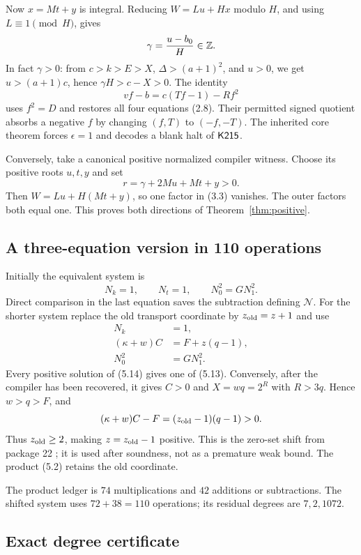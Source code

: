 Now \(x=Mt+y\) is integral. Reducing \(W=Lu+Hx\) modulo \(H\),
and using \(L\equiv1\pmod H\), gives
\[
\gamma=\frac{u-b_0}{H}\in\mathbb Z.
\]
In fact \(\gamma>0\): from \(c>k>E>X\),
\(\Delta>(a+1)^2\), and \(u>0\), we get
\(u>(a+1)c\), hence \(\gamma H>c-X>0\).
The identity
\[
vf-b=c(Tf-1)-Rf^2
\]
uses \(f^2=D\) and restores all four equations (2.8).
Their permitted signed quotient absorbs a negative \(f\) by changing
\((f,T)\) to \((-f,-T)\).
The inherited core theorem forces \(\epsilon=1\) and decodes a
blank halt of \(\mathsf{K215}\).

Conversely, take a canonical positive normalized compiler witness.
Choose its positive roots \(u,t,y\) and set
\[
r=\gamma+2Mu+Mt+y>0.
\tag{5.12}
\]
Then \(W=Lu+H(Mt+y)\), so one factor in (3.3) vanishes.
The outer factors both equal one. This proves both directions of
Theorem~\ref{thm:positive}.

\subsection{A three-equation version in 110 operations}

Initially the equivalent system is
\[
N_k=1,\qquad N_t=1,\qquad N_0^2=GN_1^2.
\tag{5.13}
\]
Direct comparison in the last equation saves the subtraction
defining \(\mathcal N\).
For the shorter system replace the old transport coordinate by
\(z_{\rm old}=z+1\) and use
\[
\boxed{
\begin{aligned}
N_k&=1,\\
(\kappa+w)C&=F+z(q-1),\\
N_0^2&=GN_1^2.
\end{aligned}}
\tag{5.14}
\]
Every positive solution of (5.14) gives one of (5.13).
Conversely, after the compiler has been recovered, it gives
\(C>0\) and \(X=wq=2^R\) with \(R>3q\). Hence \(w>q>F\), and
\[
(\kappa+w)C-F=(z_{\rm old}-1)(q-1)>0.
\]
Thus \(z_{\rm old}\ge2\), making \(z=z_{\rm old}-1\) positive.
This is the zero-set shift from package 22 \cite{monic22};
it is used after soundness, not as a premature weak bound.
The product (5.2) retains the old coordinate.

The product ledger is \(74\) multiplications and \(42\) additions
or subtractions. The shifted system uses \(72+38=110\) operations;
its residual degrees are \(7,2,1072\).

\subsection{Exact degree certificate}

